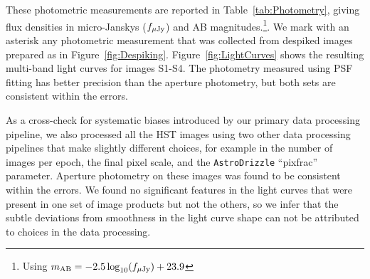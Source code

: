 These photometric measurements are reported in Table~\ref{tab:Photometry}, giving flux densities in micro-Janskys ($f_{\mu\rm{Jy}}$) and AB magnitudes.\footnote{Using $m_{\rm AB}=-2.5\log_{10}(f_{\mu\rm{Jy}})+23.9$}.  We mark with an asterisk any photometric measurement that was collected from despiked images prepared as in Figure~\ref{fig:Despiking}. Figure~\ref{fig:LightCurves} shows the resulting multi-band light curves for images S1-S4. The photometry measured using PSF fitting has better precision than the aperture photometry, but both sets are consistent within the errors.   

As a cross-check for systematic biases introduced by our primary data processing pipeline, we also processed all the HST images using two other data processing pipelines that make slightly different choices, for example in the number of images per epoch, the final pixel scale, and the {\tt AstroDrizzle} ``pixfrac'' parameter.  Aperture photometry on these images was found to be consistent within the errors. We found no significant features in the light curves that were present in one set of image products but not the others, so we infer that the subtle deviations from smoothness in the light curve shape can not be attributed to choices in the data processing. 
